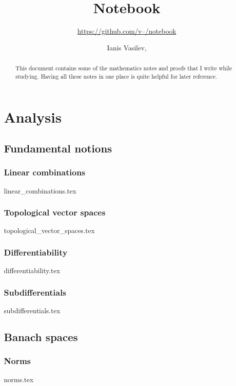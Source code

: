 \documentclass[numbers=endperiod, bibliography=totocnumbered]{scrartcl}
\title{Notebook}
\subtitle{\href{https://github.com/v--/notebook}{https://github.com/v--/notebook}}
\author{Ianis Vasilev, \Email{ianis@ivasilev.net}}
\date{}
\begin{document}
\sloppy

\maketitle

\begin{abstract}
  This document contains some of the mathematics notes and proofs that I write while studying. Having all these notes in one place is quite helpful for later reference.
\end{abstract}

\tableofcontents

\section{Analysis}\label{sec:analysis}
\subsection{Fundamental notions}\label{sec:analysis/fundamental_notions}
\subsubsection{Linear combinations}\label{sec:linear_combinations}
{linear_combinations.tex}
\subsubsection{Topological vector spaces}\label{sec:topological_vector_spaces}
{topological_vector_spaces.tex}
\subsubsection{Differentiability}\label{sec:differentiability}
{differentiability.tex}
\subsubsection{Subdifferentials}\label{sec:subdifferentials}
{subdifferentials.tex}

\subsection{Banach spaces}\label{sec:banach_spaces}
\subsubsection{Norms}\label{sec:norms}
{norms.tex}
\end{document}
